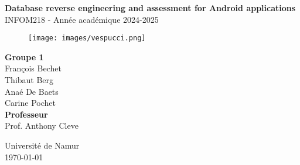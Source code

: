 \documentclass[a4paper,11pt]{article}
\begin{document}
\begin{titlepage}
    \begin{center}
        \vspace*{2cm}
        \Huge\textbf{Database reverse engineering and assessment for
            Android applications}\\
        \vspace{1cm}
        \Large INFOM218 - Année académique 2024-2025\\
        \begin{figure}[!ht]
            \centering
            \texttt{[image: images/vespucci.png]}
            \label{fig:logo-vespucci}
        \end{figure}
        {\Large\textbf{Groupe 1}}\\
        \vspace{0.5cm}
        {\Large François Bechet\\
            Thibaut Berg}\\
        Anaé De Baets\\
        Carine Pochet\\
        \vspace{1cm}
        {\Large\textbf{Professeur}}\\
        \vspace{0.5cm}
        {\Large Prof. Anthony Cleve}\\
        \vfill
        \begin{figure}[!ht]
            \centering
            
            \label{fig:logo-unamur}
        \end{figure}
        \Large Université de Namur\\
        \Large \today
    \end{center}
\end{titlepage}

\tableofcontents
\newpage


\newpage

\newpage

\newpage

\newpage
\end{document}
